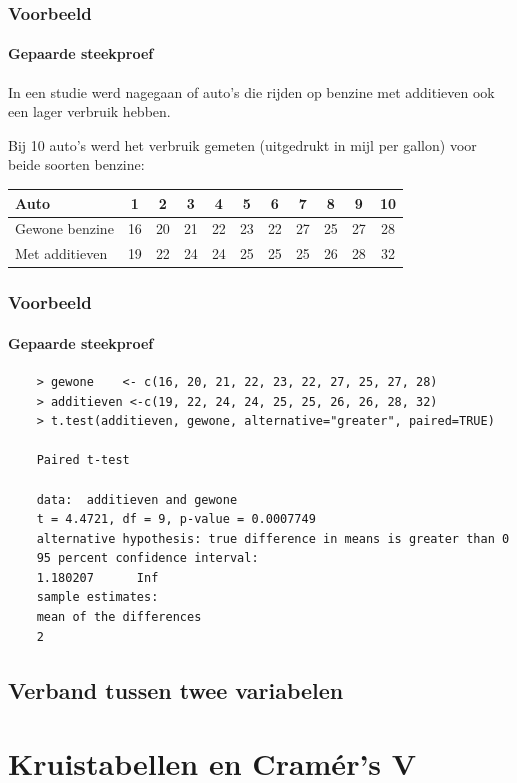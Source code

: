 \begin{frame}
	\frametitle{Voorbeeld}
	\framesubtitle{Gepaarde steekproef}
	
	In een studie werd nagegaan of auto's die rijden op benzine met additieven ook een lager verbruik hebben.
	
	Bij 10 auto's werd het verbruik gemeten (uitgedrukt in mijl per gallon) voor beide soorten benzine:
	
	\vspace{.5cm}
	\centering
	\begin{tabular}{|l|c|c|c|c|c|c|c|c|c|c|}
		\hline
		Auto           & 1  & 2  & 3  & 4  & 5  & 6  & 7  & 8  & 9  & 10 \\ \hline
		Gewone benzine & 16 & 20 & 21 & 22 & 23 & 22 & 27 & 25 & 27 & 28 \\ \hline
		Met additieven & 19 & 22 & 24 & 24 & 25 & 25 & 25 & 26 & 28 & 32 \\ \hline
	\end{tabular} 
\end{frame}

\begin{frame}[fragile]
	\frametitle{Voorbeeld}
	\framesubtitle{Gepaarde steekproef}
	
	\footnotesize
	\begin{verbatim}
	> gewone    <- c(16, 20, 21, 22, 23, 22, 27, 25, 27, 28)
	> additieven <-c(19, 22, 24, 24, 25, 25, 26, 26, 28, 32)
	> t.test(additieven, gewone, alternative="greater", paired=TRUE)
	
	Paired t-test
	
	data:  additieven and gewone
	t = 4.4721, df = 9, p-value = 0.0007749
	alternative hypothesis: true difference in means is greater than 0
	95 percent confidence interval:
	1.180207      Inf
	sample estimates:
	mean of the differences 
	2
	\end{verbatim}
\end{frame}

\subsection{Verband tussen twee variabelen}
\section{Kruistabellen en Cramér's V}
\sectionframelogo{}

